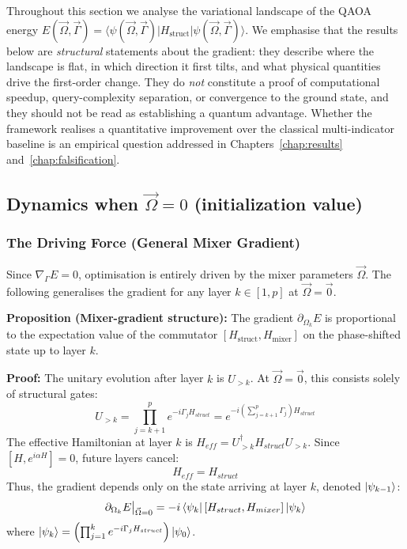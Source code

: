 \documentclass[12pt, a4paper, oneside]{report}
\begin{document}
Throughout this section we analyse the variational landscape of the QAOA energy $E(\vec\Omega,\vec\Gamma) = \langle\psi(\vec\Omega,\vec\Gamma)|H_{\text{struct}}|\psi(\vec\Omega,\vec\Gamma)\rangle$. We emphasise that the results below are \emph{structural} statements about the gradient: they describe where the landscape is flat, in which direction it first tilts, and what physical quantities drive the first-order change. They do \emph{not} constitute a proof of computational speedup, query-complexity separation, or convergence to the ground state, and they should not be read as establishing a quantum advantage. Whether the framework realises a quantitative improvement over the classical multi-indicator baseline is an empirical question addressed in Chapters~\ref{chap:results} and~\ref{chap:falsification}.

\subsection{Dynamics when $\vec{\Omega}= 0$ (initialization value)}
\subsubsection{The Driving Force (General Mixer Gradient)}
Since $\nabla_\Gamma E = 0$, optimisation is entirely driven by the mixer parameters $\vec{\Omega}$. The following generalises the gradient for any layer $k \in [1, p]$ at $\vec{\Omega} = \vec{0}$.

\textbf{Proposition (Mixer-gradient structure):} The gradient $\partial_{\Omega_k} E$ is proportional to the expectation value of the commutator $[H_{\text{struct}}, H_{\text{mixer}}]$ on the phase-shifted state up to layer $k$.

\textbf{Proof:}
The unitary evolution after layer $k$ is $U_{>k}$. At $\vec{\Omega}=\vec{0}$, this consists solely of structural gates:
\begin{equation}
    U_{>k} = \prod_{j=k+1}^p e^{-i\Gamma_j H_{struct}} = e^{-i (\sum_{j=k+1}^p \Gamma_j) H_{struct}}
\end{equation}
The effective Hamiltonian at layer $k$ is $H_{eff} = U_{>k}^\dagger H_{struct} U_{>k}$. Since $[H, e^{i\alpha H}] = 0$, future layers cancel:
\begin{equation}
    H_{eff} = H_{struct}
\end{equation}
Thus, the gradient depends only on the state arriving at layer $k$, denoted $\ket{\psi_{k-1}}$:
\begin{equation}
    \partial_{\Omega_k} E \big|_{\vec{\Omega}=0} = -i \bra{\psi_{k}} [H_{struct}, H_{mixer}] \ket{\psi_{k}}
\label{eq:mixer-gradient}
\end{equation}
where $\ket{\psi_{k}} = \left( \prod_{j=1}^{k} e^{-i\Gamma_j H_{struct}} \right) \ket{\psi_0}$.\\
\end{document}
